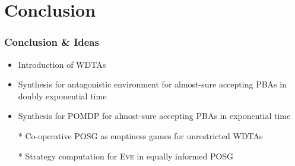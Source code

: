 \documentclass{beamer}
\newcommand{\eve}{\textsc{Eve}}
\begin{document}
  \section{Conclusion}
  \begin{frame}
    \frametitle{Conclusion \& Ideas}
    \begin{itemize}
      \item Introduction of \acp{WDTA}
      \item Synthesis for antagonistic environment for almost-sure accepting
        \acp{PBA} in doubly exponential time
      \item Synthesis for \ac{POMDP} for almost-sure accepting \acp{PBA} in
        exponential time
      \item[*] Co-operative \ac{POSG} as emptiness games for unrestricted
        \acp{WDTA}
      \item[*] Strategy computation for \eve{} in equally informed \ac{POSG}
    \end{itemize}
  \end{frame}
\end{document}
